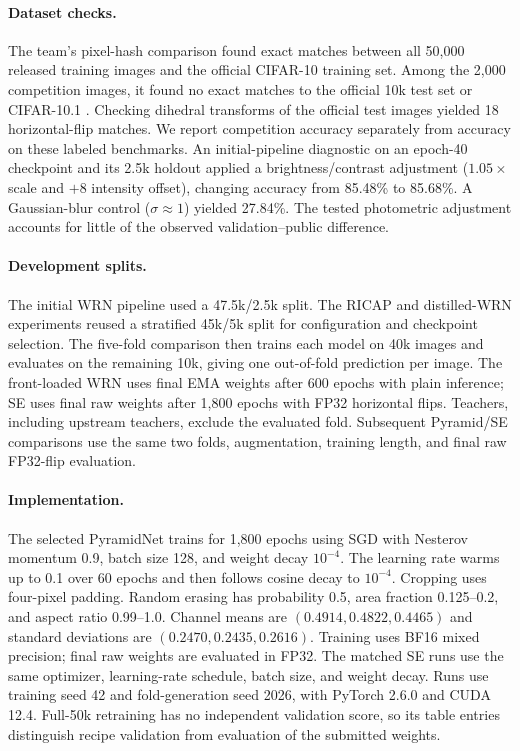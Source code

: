 \documentclass[letterpaper]{article} %
\begin{document}
\paragraph{Dataset checks.}
The team's pixel-hash comparison found exact matches between all 50,000 released training images and the official CIFAR-10 training set. Among the 2,000 competition images, it found no exact matches to the official 10k test set or CIFAR-10.1 \cite{recht2018cifar}. Checking dihedral transforms of the official test images yielded 18 horizontal-flip matches. We report competition accuracy separately from accuracy on these labeled benchmarks. An initial-pipeline diagnostic on an epoch-40 checkpoint and its 2.5k holdout applied a brightness/contrast adjustment ($1.05\times$ scale and $+8$ intensity offset), changing accuracy from 85.48\% to 85.68\%. A Gaussian-blur control ($\sigma\approx1$) yielded 27.84\%. The tested photometric adjustment accounts for little of the observed validation--public difference.

\paragraph{Development splits.}
The initial WRN pipeline used a 47.5k/2.5k split. The RICAP and distilled-WRN experiments reused a stratified 45k/5k split for configuration and checkpoint selection. The five-fold comparison then trains each model on 40k images and evaluates on the remaining 10k, giving one out-of-fold prediction per image. The front-loaded WRN uses final EMA weights after 600 epochs with plain inference; SE uses final raw weights after 1,800 epochs with FP32 horizontal flips. Teachers, including upstream teachers, exclude the evaluated fold. Subsequent Pyramid/SE comparisons use the same two folds, augmentation, training length, and final raw FP32-flip evaluation.

\paragraph{Implementation.}
The selected PyramidNet trains for 1,800 epochs using SGD with Nesterov momentum 0.9, batch size 128, and weight decay $10^{-4}$. The learning rate warms up to 0.1 over 60 epochs and then follows cosine decay to $10^{-4}$. Cropping uses four-pixel padding. Random erasing has probability 0.5, area fraction 0.125--0.2, and aspect ratio 0.99--1.0. Channel means are $(0.4914,0.4822,0.4465)$ and standard deviations are $(0.2470,0.2435,0.2616)$. Training uses BF16 mixed precision; final raw weights are evaluated in FP32. The matched SE runs use the same optimizer, learning-rate schedule, batch size, and weight decay. Runs use training seed 42 and fold-generation seed 2026, with PyTorch 2.6.0 and CUDA 12.4. Full-50k retraining has no independent validation score, so its table entries distinguish recipe validation from evaluation of the submitted weights.
\end{document}
